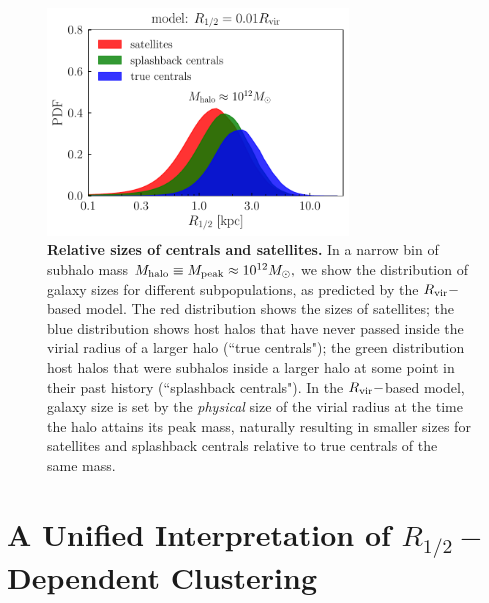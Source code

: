 \documentclass[usenatbib,usegraphicx,letterpaper]{mn2e}
\newcommand{\rhalf}{R_{1/2}}
\newcommand{\mpeak}{M_{\rm peak}}
\newcommand{\mhalo}{M_{\rm halo}}
\newcommand{\rvir}{R_{\rm vir}}
\newcommand{\msun}{M_\odot}
\begin{document}
\begin{figure}
\centering
\includegraphics[width=8cm]{FIGS/rvir_only_cen_sat_sizes.pdf}
\caption{
{\bf Relative sizes of centrals and satellites.}
In a narrow bin of subhalo mass $\mhalo\equiv\mpeak\approx10^{12}\msun,$ we show the distribution of galaxy sizes for different subpopulations, as predicted by the $\rvir-$based model. The red distribution shows the sizes of satellites; the blue distribution shows host halos that have never passed inside the virial radius of a larger halo (``true centrals"); the green distribution host halos that were subhalos inside a larger halo at some point in their past history (``splashback centrals"). In the $\rvir-$based model, galaxy size is set by the {\em physical} size of the virial radius at the time the halo attains its peak mass, naturally resulting in smaller sizes for satellites and splashback centrals relative to true centrals of the same mass.
}
\label{fig:censatsizehist}
\end{figure}


\section{A Unified Interpretation of $\rhalf-$Dependent Clustering}
\label{sec:interpretation}
\end{document}
